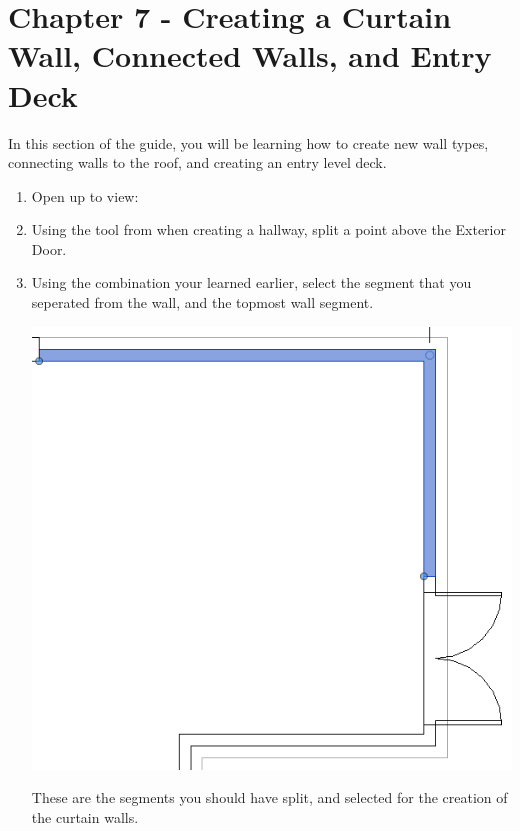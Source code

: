 \documentclass{tufte-book} %
\begin{document}
\chapter{Chapter 7 - Creating a Curtain Wall, Connected Walls, and Entry Deck}
\label{ch:7}
In this section of the guide, you will be learning how to create new wall types, connecting walls to the roof, and creating an entry level deck.
\begin{enumerate}
\section{Creating a Curtain Wall}
	\item Open up to view: 
	\item Using the  tool from when creating a hallway, split a point above the  Exterior Door.
	\item Using the  combination your learned earlier, select the segment that you seperated from the wall, and the topmost  wall segment.
	
	\begin{marginfigure}
		\includegraphics[width=\linewidth]{revitcurtainwallinit.png}
		\caption[The Revit Curtain Wall Segments Selected]{These are the segments you should have split, and selected for the creation of the curtain walls.}
		\label{fig:revcurtwallinit}
	\end{marginfigure}
	

\end{enumerate}
\end{document}
